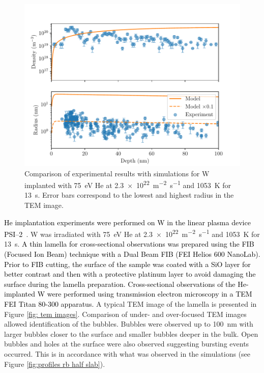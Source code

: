 \begin{figure} [h!]
    \centering
    \includegraphics[width=\linewidth]{Figures/Chapter4/comparison_model_exp.pdf}
    \caption{Comparison of experimental results with simulations for W implanted with \SI{75}{eV} He at \SI{2.3e22}{m^{-2}.s^{-1}} and \SI{1053}{K} for \SI{13}{s}. Error bars correspond to the lowest and highest radius in the TEM image.}
    \label{fig: exp model comparison}
\end{figure}


\textcolor{black}{He implantation experiments were performed on W in the linear plasma device PSI--2~}.
W was irradiated with \SI{75}{eV} He at \SI{2.3e22}{m^{-2}.s^{-1}} and \SI{1053}{K} for \SI{13}{s}.
\textcolor{black}{
A thin lamella for cross-sectional observations was prepared using the FIB (Focused Ion Beam) technique with a Dual Beam FIB (FEI Helios 600 NanoLab).
Prior to FIB cutting, the surface of the sample was coated with a SiO layer for better contrast and then with a protective platinum layer to avoid damaging the surface during the lamella preparation.
Cross-sectional observations of the He-implanted W were performed using transmission electron microscopy in a TEM FEI Titan 80-300 apparatus.
}
A typical TEM image of the lamella is presented in Figure \ref{fig: tem images}.
Comparison of under- and over-focused TEM images allowed identification of the bubbles.
Bubbles were observed up to \SI{100}{nm} with larger bubbles closer to the surface and smaller bubbles deeper in the bulk.
Open bubbles and holes at the surface were also observed suggesting bursting events occurred.
This is in accordance with what was observed in the simulations (see Figure \ref{fig:profiles rb half slab}).

